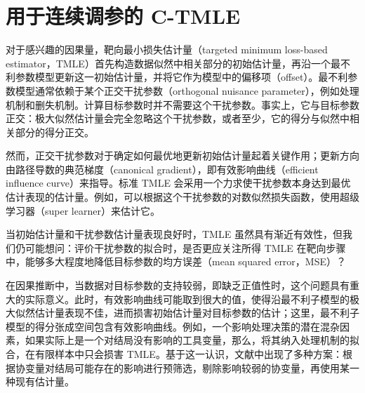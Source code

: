 \chapter{用于连续调参的 C-TMLE}
\label{ch:ctmle-continuous-tuning}

对于感兴趣的因果量，靶向最小损失估计量（targeted minimum loss-based estimator，TMLE）首先构造数据似然中相关部分的初始估计量，再沿一个最不利参数模型更新这一初始估计量，并将它作为模型中的偏移项（offset）。最不利参数模型通常依赖于某个正交干扰参数（orthogonal nuisance parameter），例如处理机制和删失机制。计算目标参数时并不需要这个干扰参数。事实上，它与目标参数正交：极大似然估计量会完全忽略这个干扰参数，或者至少，它的得分与似然中相关部分的得分正交。

然而，正交干扰参数对于确定如何最优地更新初始估计量起着关键作用；更新方向由路径导数的典范梯度（canonical gradient），即有效影响曲线（efficient influence curve）来指导。标准 TMLE 会采用一个力求使干扰参数本身达到最优估计表现的估计量。例如，可以根据这个干扰参数的对数似然损失函数，使用超级学习器（super learner）来估计它。

\begin{sourcebox}
当初始估计量和干扰参数估计量表现良好时，TMLE 虽然具有渐近有效性，但我们仍可能想问：评价干扰参数的拟合时，是否更应关注所得 TMLE 在靶向步骤中，能够多大程度地降低目标参数的均方误差（mean squared error，MSE）？
\end{sourcebox}

在因果推断中，当数据对目标参数的支持较弱，即缺乏正值性时，这个问题具有重大的实际意义。此时，有效影响曲线可能取到很大的值，使得沿最不利子模型的极大似然估计量表现不佳，进而损害初始估计量对目标参数的估计；这里，最不利子模型的得分张成空间包含有效影响曲线。例如，一个影响处理决策的潜在混杂因素，如果实际上是一个对结局没有影响的工具变量，那么，将其纳入处理机制的拟合，在有限样本中只会损害 TMLE。基于这一认识，文献中出现了多种方案：根据协变量对结局可能存在的影响进行预筛选，剔除影响较弱的协变量，再使用某一种现有估计量。

